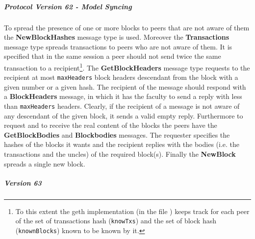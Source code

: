 \subparagraph{Protocol Version 62 - Model Syncing}
To spread the presence of one or more blocks to peers that are not aware
of them the \textbf{NewBlockHashes} message type is used.
Moreover the \textbf{Transactions} message type spreads transactions to
peers who are not aware of them. It is specified that
in the same session a peer should not send twice the same
transaction to a
recipient\footnote{To this extent the
geth implementation (in the file ) keeps track for each
peer of the set of transactions hash (\texttt{knowTxs}) and the set of
block hash (\texttt{knownBlocks}) known to be known by it.}.
The \textbf{GetBlockHeaders} message type requests to the recipient at most
\texttt{maxHeaders} block headers descendant from the block with a given
number or a given hash.
The recipient of the message should respond with a \textbf{BlockHeaders}
message, in which it has the faculty to send a reply with less than
\texttt{maxHeaders} headers. Clearly, if the recipient of a message
is not aware of any descendant of the given block, it sends a valid empty
reply. Furthermore to request and to receive the real content of the blocks the
peers have the \textbf{GetBlockBodies} and \textbf{Blockbodies} messages.
The requester specifies the hashes of the blocks it wants and the recipient
replies with the bodies (i.e. the transactions and the uncles) of
the required block(s).
Finally the \textbf{NewBlock} spreads a single new block.

\subparagraph{Version 63}



